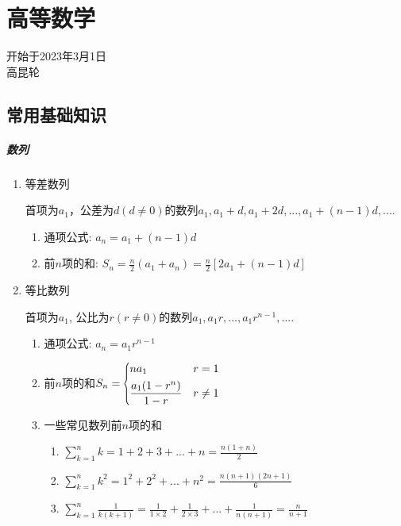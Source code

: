 \part{高等数学}
开始于2023年3月1日\\高昆轮
\chapter*{常用基础知识}
\subsubsection{数列}
\begin{enumerate}
\item 等差数列\par
首项为$ a_{1} $，公差为$ d(d\neq 0) $的数列$ a_{1},a_{1}+d,a_{1}+2d,...,a_{1}+(n-1)d,... $.
\begin{enumerate}
\item 通项公式: $ a_{n}=a_{1}+(n-1)d $
\item 前$ n $项的和: $ S_{n}=\frac{n}{2}(a_{1}+a_{n})=\frac{n}{2}[2a_{1}+(n-1)d] $
\end{enumerate}
\item 等比数列\par
首项为$ a_{1} $, 公比为$ r(r\neq 0) $的数列$ a_{1},a_{1}r,...,a_{1}r^{n-1},... $.
\begin{enumerate}
\item 通项公式: $ a_{n}=a_{1}r^{n-1} $
\item 前$ n $项的和$ S_{n}=\scaleleftright[6pt]{\biggl\{}{\begin{aligned}
& na_{1}\ & r=1 \\
& \frac{a_{1}(1-r^{n})}{1-r} & r\neq 1
\end{aligned}}{.} $
\item 一些常见数列前$ n $项的和\par
\begin{enumerate}
\item $ \sum_{k=1}^{n}k=1+2+3+...+n=\frac{n(1+n)}{2} $
\item $ \sum_{k=1}^{n}k^{2}=1^{2}+2^{2}+...+n^{2}=\frac{n(n+1)(2n+1)}{6} $
\item $ \sum_{k=1}^{n}\frac{1}{k(k+1)}=\frac{1}{1\times 2}+\frac{1}{2\times 3}+...+\frac{1}{n(n+1)}=\frac{n}{n+1} $
\end{enumerate}
\end{enumerate}
\end{enumerate}
